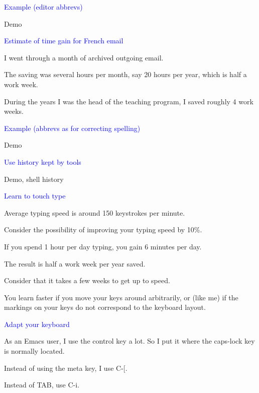 \documentclass{slides}
\newcommand{\ti}[1]{\begin{center}\Large{\textcolor{blue}{#1}}\end{center}}
\begin{document}
\begin{slide}\ti{Example (editor abbrevs)}

Demo

\vfill\end{slide}
\begin{slide}\ti{Estimate of time gain for French email}

I went through a month of archived outgoing email.

The saving was several hours per month, say 20 hours per year, which
is half a work week.

During the years I was the head of the teaching program, I saved
roughly 4 work weeks.

\vfill\end{slide}
\begin{slide}\ti{Example (abbrevs as for correcting spelling)}

Demo

\vfill\end{slide}
\begin{slide}\ti{Use history kept by tools}

Demo, shell history

\vfill\end{slide}
\begin{slide}\ti{Learn to touch type}

Average typing speed is around 150 keystrokes per minute.

Consider the possibility of improving your typing speed by 10\%. 

If you spend 1 hour per day typing, you gain 6 minutes per day.

The result is half a work week per year saved.

Consider that it takes a few weeks to get up to speed.

You learn faster if you move your keys around arbitrarily, or (like
me) if the markings on your keys do not correspond to the keyboard
layout.

\vfill\end{slide}
\begin{slide}\ti{Adapt your keyboard}

As an Emacs user, I use the control key a lot.  So I put it where the
caps-lock key is normally located.  

Instead of using the meta key, I use C-[.

Instead of TAB, use C-i.

\vfill\end{slide}
\end{document}
